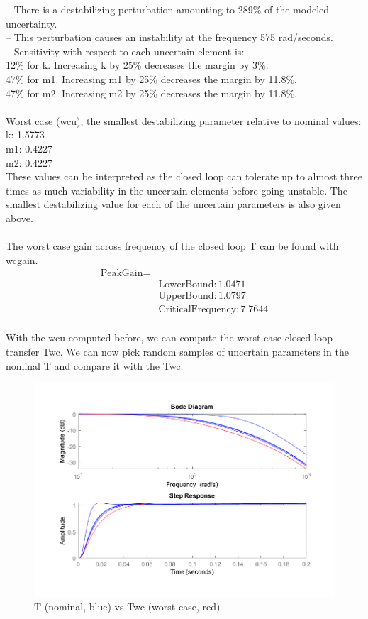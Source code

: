 \documentclass{article}[12pt]
\begin{document}
 -- There is a destabilizing perturbation amounting to 289\% of the modeled uncertainty.\\
 -- This perturbation causes an instability at the frequency 575 rad/seconds.\\
 -- Sensitivity with respect to each uncertain element is:           \\
      12\% for k. Increasing k by 25\% decreases the margin by 3\%.    \\
      47\% for m1. Increasing m1 by 25\% decreases the margin by 11.8\%.\\
      47\% for m2. Increasing m2 by 25\% decreases the margin by 11.8\%.\\ \\
Worst case (wcu), the smallest destabilizing parameter relative to nominal values:\\
k: 1.5773\\
m1: 0.4227\\
m2: 0.4227\\

These values can be interpreted as the closed loop can tolerate up to almost three times as much variability in the uncertain elements before going unstable. The smallest destabilizing value for each of the uncertain parameters is also given above.\\ \\
The worst case gain across frequency of the closed loop T can be found with wcgain.
\begin{align*}
    \text{PeakGain} =& \\
           &\text{LowerBound}: 1.0471\\
           &\text{UpperBound}: 1.0797\\
    &\text{CriticalFrequency}: 7.7644\\
\end{align*}

With the wcu computed before, we can compute the worst-case closed-loop transfer Twc. We can now pick random samples of uncertain parameters in the nominal T and compare it with the Twc.
\begin{figure} [H]
    \centering
    \includegraphics[scale =.6]{figures/Twc.png}
    \caption{T (nominal, blue) vs Twc (worst case, red)}
    \label{fig:my_label}
\end{figure}
\end{document}
